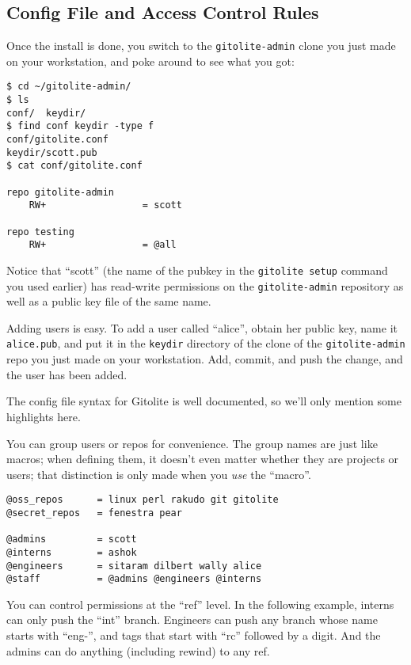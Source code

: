 \documentclass[a4paper]{book}
\begin{document}
\subsection{Config File and Access Control Rules}\label{config-file-and-access-control-rules}

Once the install is done, you switch to the \texttt{gitolite-admin} clone you just made on your workstation, and poke around to see what you got:

\begin{shaded}\begin{verbatim}
$ cd ~/gitolite-admin/
$ ls
conf/  keydir/
$ find conf keydir -type f
conf/gitolite.conf
keydir/scott.pub
$ cat conf/gitolite.conf

repo gitolite-admin
    RW+                 = scott

repo testing
    RW+                 = @all
\end{verbatim}\end{shaded}

Notice that “scott” (the name of the pubkey in the \texttt{gitolite setup} command you used earlier) has read-write permissions on the \texttt{gitolite-admin} repository as well as a public key file of the same name.

Adding users is easy. To add a user called “alice”, obtain her public key, name it \texttt{alice.pub}, and put it in the \texttt{keydir} directory of the clone of the \texttt{gitolite-admin} repo you just made on your workstation. Add, commit, and push the change, and the user has been added.

The config file syntax for Gitolite is well documented, so we'll only mention some highlights here.

You can group users or repos for convenience. The group names are just like macros; when defining them, it doesn't even matter whether they are projects or users; that distinction is only made when you \emph{use} the “macro”.

\begin{shaded}\begin{verbatim}
@oss_repos      = linux perl rakudo git gitolite
@secret_repos   = fenestra pear

@admins         = scott
@interns        = ashok
@engineers      = sitaram dilbert wally alice
@staff          = @admins @engineers @interns
\end{verbatim}\end{shaded}

You can control permissions at the “ref” level. In the following example, interns can only push the “int” branch. Engineers can push any branch whose name starts with “eng-”, and tags that start with “rc” followed by a digit. And the admins can do anything (including rewind) to any ref.
\end{document}
